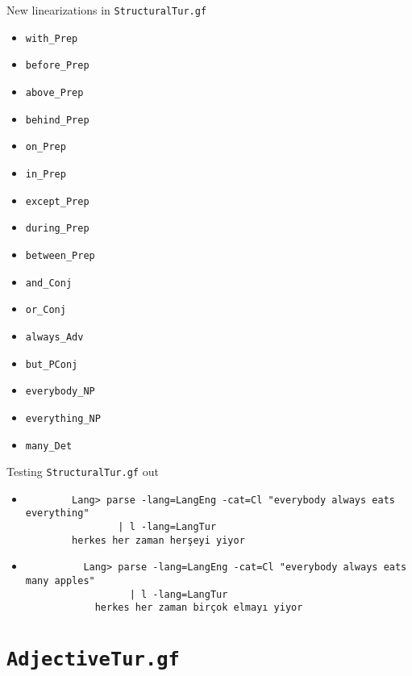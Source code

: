 \documentclass{beamer}
\begin{document}
  \begin{frame}{New linearizations in \texttt{StructuralTur.gf}}
    \scriptsize
    \begin{itemize}
      \item \texttt{with\_Prep}
      \item \texttt{before\_Prep}
      \item \texttt{above\_Prep}
      \item \texttt{behind\_Prep}
      \item \texttt{on\_Prep}
      \item \texttt{in\_Prep}
      \item \texttt{except\_Prep}
      \item \texttt{during\_Prep}
      \item \texttt{between\_Prep}
      \item \texttt{and\_Conj}
      \item \texttt{or\_Conj}
      \item \texttt{always\_Adv}
      \item \texttt{but\_PConj}
      \item \texttt{everybody\_NP}
      \item \texttt{everything\_NP}
      \item \texttt{many\_Det}
    \end{itemize}
    \normalsize
  \end{frame}

  \begin{frame}[fragile]{Testing \texttt{StructuralTur.gf} out}
    \begin{itemize}
      \item<1->
        \begin{lstlisting}
        Lang> parse -lang=LangEng -cat=Cl "everybody always eats everything"
                | l -lang=LangTur
        herkes her zaman herşeyi yiyor
        \end{lstlisting}
      \item<3->
        \begin{lstlisting}
          Lang> parse -lang=LangEng -cat=Cl "everybody always eats many apples"
                  | l -lang=LangTur
            herkes her zaman birçok elmayı yiyor
        \end{lstlisting}
    \end{itemize}
  \end{frame}

  \section{\texttt{AdjectiveTur.gf}}
\end{document}
